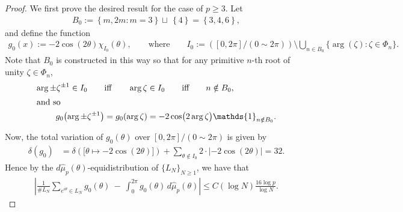 \documentclass[11pt,letterpaper,reqno]{amsart}
\theoremstyle{definition}
\numberwithin{equation}{section}
\numberwithin{figure}{section}
\numberwithin{table}{section}
\newcommand{\lrabs}[1]{\!\left\lvert #1 \right\lvert}
\newcommand{\lrp}[1]{\!\left(#1\right)}
\newcommand{\lrcb}[1]{\!\left\{#1\right\}}
\begin{document}
\begin{proof}
    We first prove the desired result for the case of $p \ge 3$. 
    Let 
    \begin{align}
        B_0 := 
        \lrcb{
            m,2m : m=3
        } 
        \sqcup\, 
        \lrcb{
            4
        }
        = \lrcb{3,4,6},
    \end{align}
    and define the function
    \begin{align} \label{eqn:temp-g0-def}
        g_0(x) := -2 \cos(2\theta) \chi_{I_0}(\theta), 
        \qquad \text{where} \qquad
        I_0 := ([0,2\pi]/(0\sim2\pi)) \setminus\bigcup_{n \in B_0} \big\{\arg(\zeta) : \zeta \in \Phi_n\big\}.
    \end{align}
    Note that $B_0$ is constructed in this way so that for any primitive $n$-th root of unity $\zeta \in \Phi_n$,
    \begin{align} 
        \arg \pm \zeta^{\pm 1} \in I_0 
        \qquad &\text{iff} \qquad  
        \arg \zeta \in I_0 
        \qquad \text{iff} \qquad
        n \notin B_0, \\
        \intertext{and so}
        g_0\lrp{\arg \pm \zeta^{\pm1} }
        &= g_0\lrp{\arg \zeta }
        = -2 \cos\!\big(2 \arg \zeta\big) \mathds{1}_{n \notin B_0}  
        \label{eqn:temp-formula-for-g0(2Re(+-zeta^+1))}.
    \end{align}
    
    Now, the total variation of $g_0(\theta)$ over $[0,2\pi]/(0\sim2\pi)$ is given by
    \begin{align}
        \delta(g_0) &= \delta\lrp{\big[\theta \mapsto -2 \cos(2\theta)\big]} + \sum_{\theta \notin I_0} 2 \cdot \lrabs{-2 \cos(2\theta)} = 32.
    \end{align}
    Hence by the $d\hat\mu_p(\theta)$-equidistribution of $\{L_N\}_{N\ge 1}$, we have that 
    \begin{align} \label{eqn:temp_integral_2-x2_}
        \left| \frac{1}{\# L_N} \sum_{e^{i\theta} \in L_N} g_0\!\left( \theta  \right) \ -\  \int_{0}^{2\pi} g_0(\theta) \,d\hat\mu_p(\theta) \right| \le C(\log N) \frac{16\log p}{\log N}.
    \end{align}
    

\end{proof}
\end{document}
